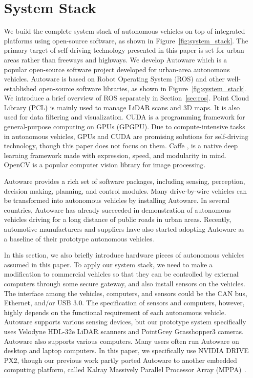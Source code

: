 \section{System Stack}

We build the complete system stack of autonomous vehicles on top of
integrated platforms using open-source software, as shown in
Figure~\ref{fig:system_stack}.
The primary target of self-driving technology presented in this paper is
set for urban areas rather than freeways and highways.
We develop Autoware which is a popular
open-source software project developed for urban-area autonomous
vehicles.
Autoware is based on Robot Operating System (ROS) and other
well-established open-source software libraries, as shown in
Figure~\ref{fig:system_stack}.
We introduce a brief overview of ROS separately in Section~\ref{sec:ros}.
Point Cloud Library (PCL) \cite{pcl} is mainly used to manage LiDAR
scans and 3D maps.
It is also used for data filtering and visualization.
CUDA \cite{cuda} is a programming framework for general-purpose
computing on GPUs (GPGPU).
Due to compute-intensive tasks in autonomous vehicles, GPUs and CUDA are
promising solutions for self-driving technology, though this paper does
not focus on them.
Caffe \cite{jia2014caffe}, \cite{caffe} is a native deep learning
framework made with expression, speed, and modularity in mind.
OpenCV \cite{opencv} is a popular computer vision library for image
processing.

Autoware provides a rich set of software packages, including sensing,
perception, decision making, planning, and control modules.
Many drive-by-wire vehicles can be transformed into autonomous vehicles
by installing Autoware.
In several countries, Autoware has already succeeded in demonstration of
autonomous vehicles driving for a long distance of public roads in urban
areas. 
Recently, automotive manufacturers and suppliers have also started
adopting Autoware as a baseline of their prototype autonomous vehicles.

In this section, we also briefly introduce hardware pieces of autonomous
vehicles assumed in this paper.
To apply our system stack, we need to make a modification to commercial
vehicles so that they can be controlled by external computers through
some secure gateway, and also install sensors on the vehicles.
The interface among the vehicles, computers, and sensors could be the
CAN bus, Ethernet, and/or USB 3.0.
The specification of sensors and computers, however, highly depends on
the functional requirement of each autonomous vehicle.
Autoware supports various sensing devices, but our prototype system
specifically uses Velodyne HDL-32e LiDAR scanners and PointGrey
Grasshopper3 cameras.
Autoware also supports various computers.
Many users often run Autoware on desktop and laptop computers.
In this paper, we specifically use NVIDIA DRIVE PX2, though our previous
work partly ported Autoware to another embedded computing platform,
called Kalray Massively Parallel Processor Array
(MPPA)~\cite{yuya2017exploring}. 

